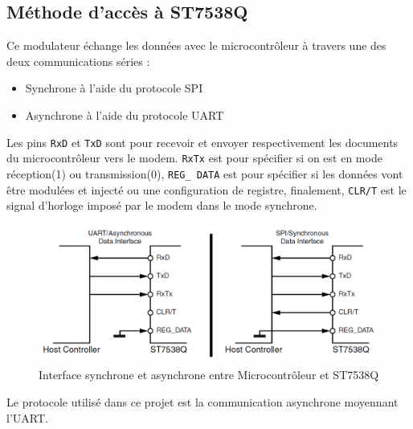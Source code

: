 \documentclass[11pt, a4paper, twoside]{book}
\begin{document}
\subsection{Méthode d’accès à ST7538Q}
Ce modulateur échange les données avec le microcontrôleur à travers une des deux communications séries :
\begin{itemize}
\item Synchrone à l'aide du protocole SPI
\item Asynchrone à l'aide du protocole UART
\end{itemize}
Les pins \texttt{RxD} et \texttt{TxD} sont pour recevoir et envoyer respectivement les documents du microcontrôleur vers le modem.
\texttt{RxTx} est pour spécifier si on est en mode réception(1) ou transmission(0),
\texttt{REG\_ DATA} est pour spécifier si les données vont être modulées et injecté ou une configuration de registre, finalement, \texttt{CLR/T} est le signal d'horloge imposé par le modem dans le mode synchrone.
\\

\begin{figure}[h]
\centering
\includegraphics[width=\textwidth]{interfSt7538Q}
\caption{Interface synchrone et asynchrone entre Microcontrôleur et ST7538Q}
\end{figure}
Le protocole utilisé dans ce projet est la communication asynchrone moyennant l'UART.
\end{document}
